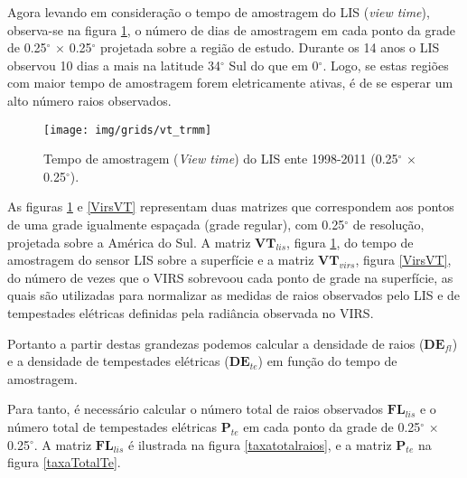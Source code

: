 
Agora levando em consideração o tempo de amostragem do LIS (\textit{view time}), observa-se na figura \ref{lisVT}, o número de dias de amostragem em cada ponto da grade de 0.25$^{\circ}$  $\times$ 0.25$^{\circ}$ projetada sobre a região de estudo. Durante os 14 anos o LIS observou 10 dias a mais na latitude 34$^{\circ}$ Sul do que em 0$^{\circ}$. Logo, se estas regiões com maior tempo de amostragem forem eletricamente ativas, é de se esperar um alto número raios observados.

\begin{figure}[!ht]
  \centering
  {{\texttt{[image: img/grids/vt\_trmm]}} }
  \caption{Tempo de amostragem (\textit{View time}) do LIS ente 1998-2011 (0.25$^{\circ}$  $\times$ 0.25$^{\circ}$).}
\label{lisVT}
\end{figure} 

As figuras  \ref{lisVT} e \ref{VirsVT} representam duas matrizes que correspondem aos pontos de uma grade igualmente espaçada (grade regular), com 0.25$^{\circ}$ de resolução, projetada sobre a América do Sul. A matriz $\mathbf{VT}_{lis}$, figura \ref{lisVT}, do tempo de amostragem do sensor LIS sobre a superfície e a matriz $\mathbf{VT}_{virs}$, figura \ref{VirsVT}, do número de vezes que o VIRS sobrevoou cada ponto de grade na superfície, as quais são utilizadas para normalizar as medidas de raios observados pelo LIS e de tempestades elétricas definidas pela radiância observada no VIRS.  


Portanto a partir destas grandezas podemos calcular a densidade de raios ($\mathbf{DE}_{fl}$) e a densidade de tempestades elétricas ($\mathbf{DE}_{te}$) em função do tempo de amostragem.

Para tanto, é necessário calcular o número total de raios observados $\mathbf{FL}_{lis}$ e o número total de tempestades elétricas $\mathbf{P}_{te}$ em cada ponto da grade de 0.25$^{\circ}$ $\times$ 0.25$^{\circ}$. A matriz $\mathbf{FL}_{lis}$ é ilustrada na figura \ref{taxatotalraios}, e a matriz $\mathbf{P}_{te}$ na figura \ref{taxaTotalTe}.


